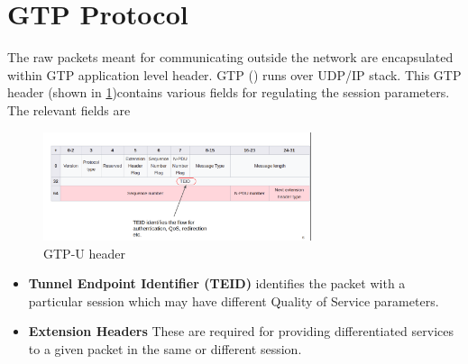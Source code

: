 \section {GTP Protocol\label{sec:GTP}}
The raw packets meant for communicating outside the network are encapsulated within GTP  application level 
header. GTP (\cite{gtp_ref}) runs over UDP/IP stack. This GTP header (shown in \ref{figGTPheader})contains 
various fields for regulating the session parameters. The relevant fields are
 \begin{figure}[htbp]
    \centering
    \includegraphics[width=0.7\textwidth, keepaspectratio]{./fig/gtp.png}
    \caption{GTP-U header \cite{gtpwiki}}
    \label{figGTPheader}
\end{figure}
 \begin{itemize}
    \item \textbf{Tunnel Endpoint Identifier (TEID)} identifies the packet with a particular session which may have different Quality of Service parameters.
    \item \textbf{Extension Headers} These are required for providing differentiated services to  a given packet in the same or different session.
 \end{itemize}

